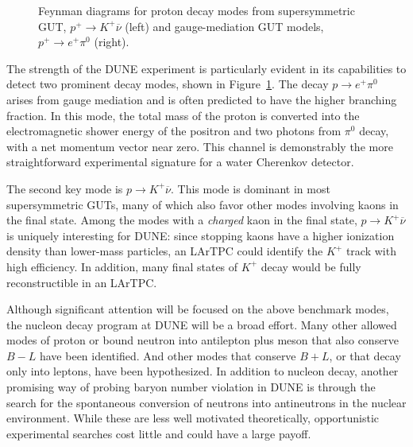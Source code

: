 \begin{figure}[!htb]
\begin{center}
  \end{center}
\caption[Proton decay modes from SUSY and gauge-mediation models]{Feynman
diagrams for proton decay modes from
supersymmetric GUT, $p^+ \rightarrow K^+ \overline{\nu}$  (left) and
gauge-mediation GUT models, $p^+ \rightarrow e^+ \pi^0$ (right).}
\label{fig:pdk_feyn}
\end{figure}
The strength of the DUNE experiment is particularly evident in its capabilities to detect
two prominent decay modes, shown in Figure~\ref{fig:pdk_feyn}. 
The decay $p \rightarrow e^+ \pi^0$ arises from gauge mediation and 
is often predicted to have the higher branching fraction.  In this mode,
the total mass of the proton is converted into the electromagnetic
shower energy of the positron and two photons from $\pi^0$ decay,
with a net momentum vector near zero.  
This channel is demonstrably the more straightforward 
experimental signature for a water Cherenkov detector. 

The second key mode is $p \rightarrow K^+ \overline{\nu}$.  This mode is
dominant in most supersymmetric GUTs, many of which also favor other modes
involving kaons in the final state.  %
Among the modes with a \emph{charged} kaon in the final state, 
$p \rightarrow K^+ \overline{\nu}$ is
uniquely interesting for DUNE: since stopping kaons have a higher ionization density
than lower-mass particles, an LArTPC could identify the $K^+$ track with 
high efficiency.  In addition, many final states of $K^+$ decay would be 
fully reconstructible in an LArTPC.

Although significant attention will be focused on the above benchmark 
modes, the nucleon decay program at DUNE will be a broad effort.
Many other allowed modes of proton or bound neutron into 
antilepton plus meson that also conserve $B-L$ have been identified.  
And other modes that conserve $B+L$, or that decay only into leptons, have been 
hypothesized.  
In addition to nucleon decay, another promising way of probing baryon number violation in DUNE is through the search for the spontaneous conversion of neutrons into antineutrons in the nuclear environment. %
While these are less well motivated theoretically, opportunistic 
experimental searches cost little and could have a large payoff.

